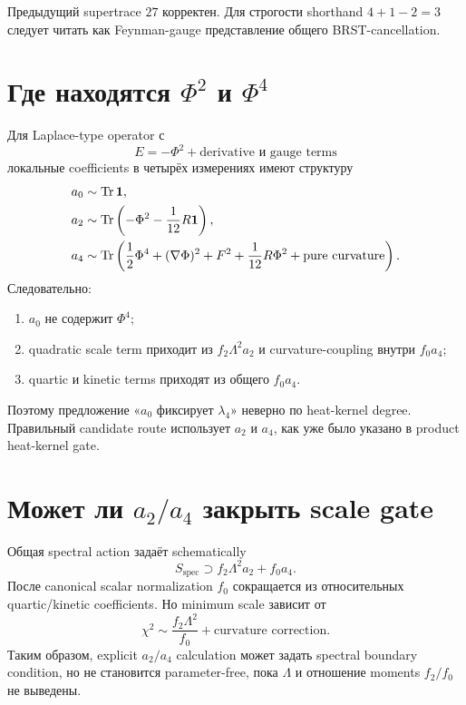\begin{proposition}
Предыдущий supertrace \(27\) корректен. Для строгости shorthand
\(4+1-2=3\) следует читать как Feynman-gauge представление общего
BRST-cancellation.
\end{proposition}

\section{Где находятся \(\Phi^2\) и \(\Phi^4\)}

Для Laplace-type operator с
\begin{equation}
 E=-\Phi^2+\text{derivative и gauge terms}
\end{equation}
локальные coefficients в четырёх измерениях имеют структуру
\begin{align}
 a_0&\sim\operatorname{Tr}\mathbf1,
 \\
 a_2&\sim\operatorname{Tr}\left(-\Phi^2-\frac1{12}R\mathbf1\right),
 \\
 a_4&\sim\operatorname{Tr}\left(
 \frac12\Phi^4
 +(\nabla\Phi)^2
 +F^2
 +\frac1{12}R\Phi^2
 +\text{pure curvature}
 \right).
\end{align}
Следовательно:
\begin{enumerate}
 \item \(a_0\) не содержит \(\Phi^4\);
 \item quadratic scale term приходит из \(f_2\Lambda^2a_2\) и
 curvature-coupling внутри \(f_0a_4\);
 \item quartic и kinetic terms приходят из общего \(f_0a_4\).
\end{enumerate}

Поэтому предложение «\(a_0\) фиксирует \(\lambda_4\)» неверно по
heat-kernel degree. Правильный candidate route использует \(a_2\) и
\(a_4\), как уже было указано в product heat-kernel gate.

\section{Может ли \(a_2/a_4\) закрыть scale gate}

Общая spectral action задаёт schematically
\begin{equation}
 S_{\mathrm{spec}}
 \supset
 f_2\Lambda^2 a_2
 +f_0a_4.
\end{equation}
После canonical scalar normalization \(f_0\) сокращается из относительных
quartic/kinetic coefficients. Но minimum scale зависит от
\begin{equation}
 \chi^2
 \sim
 \frac{f_2\Lambda^2}{f_0}
 +\text{curvature correction}.
\end{equation}
Таким образом, explicit \(a_2/a_4\) calculation может задать spectral
boundary condition, но не становится parameter-free, пока
\(\Lambda\) и отношение moments \(f_2/f_0\) не выведены.


